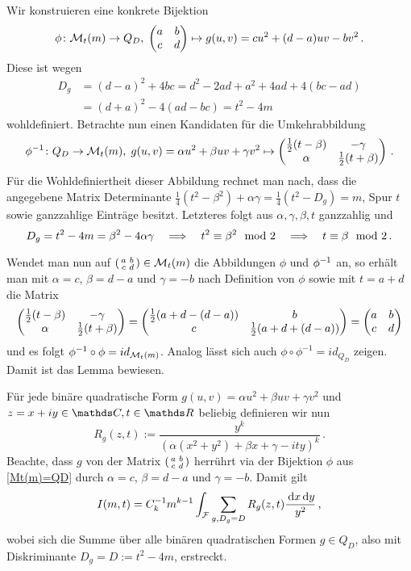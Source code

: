 \begin{bewe}
\begin{bewe}
Wir konstruieren eine konkrete Bijektion
\[
	\phi \colon \M_t (m) \to Q_D, \; \abcd \mapsto g(u, v) = cu^2 + (d-a)uv - bv^2
	\,.
\]
Diese ist wegen 
\begin{align*}
	D_g 
	&= (d-a)^2 + 4bc 
	= d^2 - 2ad + a^2 + 4ad + 4 (bc-ad) \\
	&= (d+a)^2 - 4(ad-bc) 
	= t^2 - 4m
\end{align*}
wohldefiniert. Betrachte nun einen Kandidaten für die Umkehrabbildung
\[
	\phi^{-1} \colon Q_D \to \M_t (m), \; g(u, v) = \alpha u^2 + \beta uv + \gamma v^2 \mapsto \mymat* {\frac 12 (t - \beta)} {-\gamma} \alpha {\frac 12(t + \beta)}
	\,.
\]
Für die Wohldefiniertheit dieser Abbildung rechnet man nach, dass die angegebene Matrix Determinante $\frac 14 (t^2 - \beta^2) + \alpha \gamma = \frac 14 (t^2 - D_g) = m$, Spur $t$ sowie ganzzahlige Einträge besitzt. Letzteres folgt aus $\alpha, \gamma, \beta, t$ ganzzahlig und
\[
	D_g = t^2 - 4m = \beta^2 - 4\alpha \gamma \quad \Longrightarrow \quad t^2 \equiv \beta^2 \mod 2 \quad \Longrightarrow \quad t \equiv \beta \mod 2
	\,.
\]

Wendet man nun auf $\abcd \in \M_t(m)$ die Abbildungen $\phi$ und $\phi^{-1}$ an, so erhält man mit $\alpha = c$, $\beta = d - a$ und $\gamma = -b$ nach Definition von $\phi$ sowie mit $t = a+d$ die Matrix
\[
	\mymat* {\frac 12 (t - \beta)} {-\gamma} \alpha {\frac 12(t + \beta)} = \mymat* {\frac 12 (a + d - (d-a))}bc{\frac 12(a + d + (d-a))} = \mymat* abcd
\]
und es folgt $\phi^{-1} \circ \phi = id_{\mathcal{M}_t(m)}$. Analog lässt sich auch $\phi \circ \phi^{-1} = id_{Q_D}$ zeigen. Damit ist das Lemma bewiesen.
\end{bewe}

Für jede binäre quadratische Form $g(u, v) = \alpha u^2 + \beta uv + \gamma v^2$ und $z = x + iy \in \CC, t \in \RR$ beliebig definieren wir nun
\[
	R_g(z,t) := \frac {y^k} {\left( \alpha(x^2 + y^2) + \beta x + \gamma - ity \right)^k}
	\,.
\]
Beachte, dass $g$ von der Matrix $\abcd$ herrührt via der Bijektion $\phi$ aus \autoref{Mt(m)=QD} durch $\alpha = c$, $\beta = d - a$ und $\gamma = -b$. Damit gilt
\[
	I(m, t) = C_k^{-1} m^{k-1} \int_{\mathcal{F}} \sum_{g, D_g = D} R_g(z,t) \frac {\,\mathrm{d} x \,\mathrm{d} y}{y^2}
	\,,
\]
wobei sich die Summe über alle binären quadratischen Formen $g \in Q_D$, also mit Diskriminante $D_g = D := t^2 - 4m$, erstreckt.


\end{bewe}
